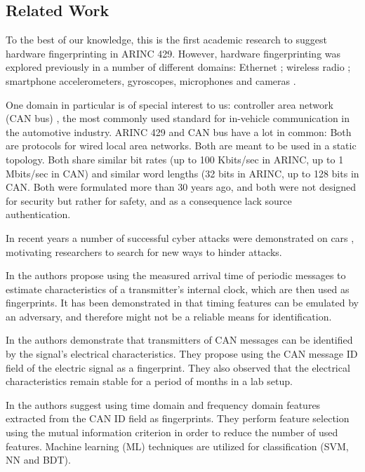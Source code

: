 \documentclass[compsoc,conference,a4paper,10pt,times]{IEEEtran}
\newcommand{\sublevel}[1]{\subsection{#1}}
\newcommand{\sublevel}[1]{\section{#1}}
\begin{document}
\sublevel{Related Work} \label{RelatedWork}
  To the best of our knowledge, this is the first academic research to suggest hardware fingerprinting in ARINC 429. However, hardware fingerprinting was explored previously in a number of different domains: Ethernet \cite{kohno2005remote, uluagac2013passive, gerdes2012physical}; wireless radio \cite{ellis2001characteristics, brik2008wireless, xu2015device}; smartphone accelerometers, gyroscopes, microphones and cameras \cite{dey2014accelprint, das2016tracking}.
  
  One domain in particular is of special interest to us: controller area network (CAN bus) \cite{bosch1991canbus}, the most commonly used standard for in-vehicle communication in the automotive industry. ARINC 429 and CAN bus have a lot in common: Both are protocols for wired local area networks. Both are meant to be used in a static topology. Both share similar bit rates (up to 100 Kbits/sec in ARINC, up to 1 Mbits/sec in CAN) and similar word lengths (32 bits in ARINC, up to 128 bits in CAN. Both were formulated more than 30 years ago, and both were not designed for security but rather for safety, and as a consequence lack source authentication.
  
  In recent years a number of successful cyber attacks were demonstrated on cars \cite{miller2015remote}, motivating researchers to search for new ways to hinder attacks.
  
  
  In \cite{cho2016fingerprinting} the authors propose using the measured arrival time of periodic messages to estimate characteristics of a transmitter's internal clock, which are then used as fingerprints. It has been demonstrated in \cite{sagong2018cloaking} that timing features can be emulated by an adversary, and therefore might not be a reliable means for identification.
  
  In \cite{murvay2014source} the authors demonstrate that transmitters of CAN messages can be identified by the signal's electrical characteristics. They propose using the CAN message ID field of the electric signal as a fingerprint. They also observed that the electrical characteristics remain stable for a period of months in a lab setup.
  
  In \cite{choi2018identifying} the authors suggest using time domain and frequency domain features extracted from the CAN ID field as fingerprints. They perform feature selection using the mutual information criterion in order to reduce the number of used features. Machine learning (ML) techniques are utilized for classification (SVM, NN and BDT).
  
\end{document}
